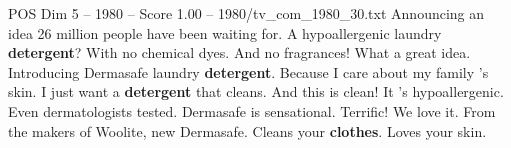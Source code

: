 \begin{textsample}{POS Dim 5 – 1980 – Score 1.00 – 1980/tv\_com\_1980\_30.txt}  \label{ex:f5_pos_017}
Announcing an idea 26 million people have been waiting for.
A hypoallergenic laundry \textbf{detergent}?
With no chemical dyes.
And no fragrances!
What a great idea.
Introducing Dermasafe laundry \textbf{detergent}.
Because I care about my family 's skin.
I just want a \textbf{detergent} that cleans.
And this is clean!
It 's hypoallergenic.
Even dermatologists tested.
Dermasafe is sensational.
Terrific!
We love it.
From the makers of Woolite, new Dermasafe.
Cleans your \textbf{clothes}.
Loves your skin.

\end{textsample}
